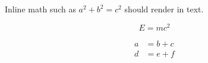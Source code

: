 \documentclass{article}
\begin{document}
Inline math such as $a^2 + b^2 = c^2$ should render in text.

\begin{equation}
E = mc^2
\end{equation}

\begin{align}
a &= b + c \\
d &= e + f
\end{align}
\end{document}
